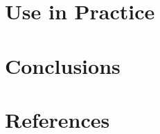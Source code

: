 \documentclass[5p]{elsarticle}
\begin{document}
\section{Use in Practice} \label{sec:usage}

\section{Conclusions} \label{sec:conclusion}

\section*{References}


\end{document}
